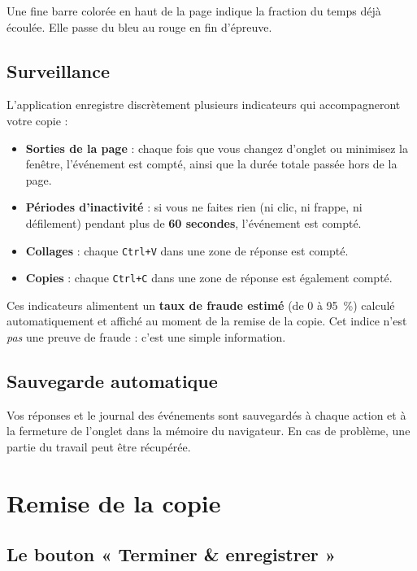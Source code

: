 \documentclass[11pt,a4paper]{article}
\begin{document}
Une fine barre colorée en haut de la page indique la fraction du temps déjà
écoulée. Elle passe du bleu au rouge en fin d'épreuve.

\subsection{Surveillance}

L'application enregistre discrètement plusieurs indicateurs qui
accompagneront votre copie :

\begin{itemize}
  \item \textbf{Sorties de la page} : chaque fois que vous changez d'onglet
        ou minimisez la fenêtre, l'événement est compté, ainsi que la durée
        totale passée hors de la page.
  \item \textbf{Périodes d'inactivité} : si vous ne faites rien (ni clic, ni
        frappe, ni défilement) pendant plus de \textbf{60 secondes},
        l'événement est compté.
  \item \textbf{Collages} : chaque \texttt{Ctrl+V} dans une zone de réponse
        est compté.
  \item \textbf{Copies} : chaque \texttt{Ctrl+C} dans une zone de réponse est
        également compté.
\end{itemize}

Ces indicateurs alimentent un \textbf{taux de fraude estimé} (de 0 à 95~\%)
calculé automatiquement et affiché au moment de la remise de la copie. Cet
indice n'est \emph{pas} une preuve de fraude : c'est une simple information.

\subsection{Sauvegarde automatique}

Vos réponses et le journal des événements sont sauvegardés à chaque action
et à la fermeture de l'onglet dans la mémoire du navigateur. En cas de
problème, une partie du travail peut être récupérée.

\section{Remise de la copie}

\subsection{Le bouton « Terminer \& enregistrer »}
\end{document}
